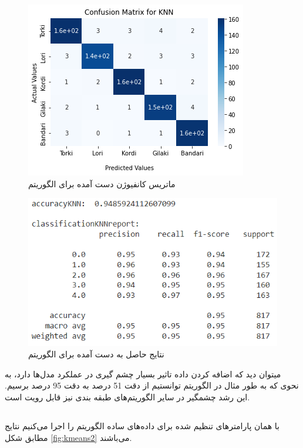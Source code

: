 \begin{figure}[h!]
	\centering
	\includegraphics[width=0.75\linewidth]{images/knn_cm_augment.png}
	\caption{ماتریس کانفیوژن دست آمده برای الگوریتم }
	\label{fig:knn_cm_augment}
\end{figure}

\begin{figure}[h!]
	\centering
	\includegraphics[width=0.9\linewidth]{images/knn_classification_results_augment.PNG}
	\caption{نتایج حاصل به دست آمده برای الگوریتم }
	\label{fig:knn_classification_results_augment}
\end{figure}
\newpage
میتوان دید که اضافه کردن داده تاثیر بسیار چشم گیری در عملکرد مدل‌ها دارد، به نحوی که به طور مثال در 
الگوریتم  توانستیم از دقت 51 درصد به دقت 95 درصد برسیم.
این رشد چشمگیر در سایر الگوریتم‌های طبقه بندی نیز قابل رویت است.

\subsection{}
\subsubsection{}
با همان پارامترهای تنظیم شده برای داده‌های ساده الگوریتم  را اجرا می‌کنیم نتایج مطابق شکل \ref{fig:kmeans2} می‌باشند.

